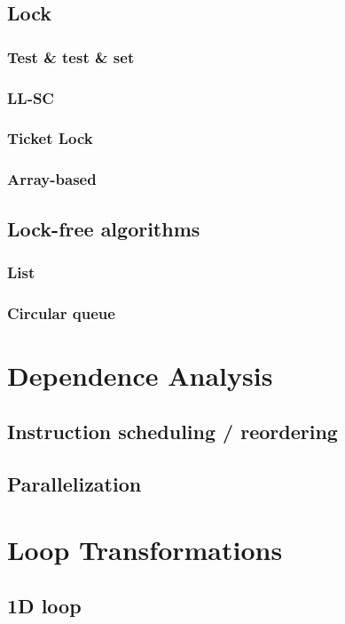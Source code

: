 \documentclass[11pt]{article}
\begin{document}
\subsection{Lock}
\label{sec:org087376f}
\subsubsection{Test \& test \& set}
\label{sec:orgf0ec196}
\subsubsection{LL-SC}
\label{sec:org30e050a}
\subsubsection{Ticket Lock}
\label{sec:org8b9a952}
\subsubsection{Array-based}
\label{sec:orgec68756}
\subsection{Lock-free algorithms}
\label{sec:orgec7d686}
\subsubsection{List}
\label{sec:org631c48a}
\subsubsection{Circular queue}
\label{sec:orgbd2331d}
\section{Dependence Analysis}
\label{sec:org7b8e976}
\subsection{Instruction scheduling / reordering}
\label{sec:orgbd5b0e8}
\subsection{Parallelization}
\label{sec:org747114d}
\section{Loop Transformations}
\label{sec:org7db6080}
\subsection{1D loop}
\label{sec:org6d7170f}
\end{document}
